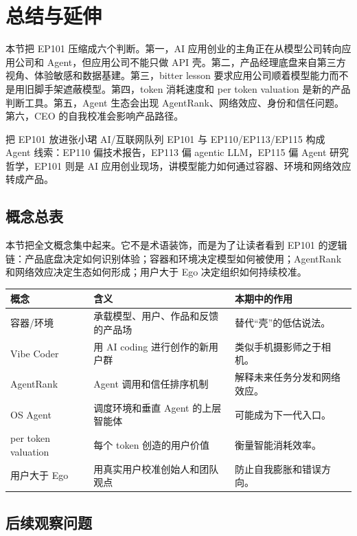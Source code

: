 \section{总结与延伸}

本节把 EP101 压缩成六个判断。第一，AI 应用创业的主角正在从模型公司转向应用公司和 Agent，但应用公司不能只做 API 壳。第二，产品经理底盘来自第三方视角、体验敏感和数据基建。第三，bitter lesson 要求应用公司顺着模型能力而不是用旧脚手架遮蔽模型。第四，token 消耗速度和 per token valuation 是新的产品判断工具。第五，Agent 生态会出现 AgentRank、网络效应、身份和信任问题。第六，CEO 的自我校准会影响产品路径。

\begin{importantbox}{把 EP101 放进张小珺 AI/互联网队列}
EP101 与 EP110/EP113/EP115 构成 Agent 线索：EP110 偏技术报告，EP113 偏 agentic LLM，EP115 偏 Agent 研究哲学，EP101 则是 AI 应用创业现场，讲模型能力如何通过容器、环境和网络效应转成产品。
\end{importantbox}

\subsection{概念总表}

本节把全文概念集中起来。它不是术语装饰，而是为了让读者看到 EP101 的逻辑链：产品底盘决定如何识别体验；容器和环境决定模型如何被使用；AgentRank 和网络效应决定生态如何形成；用户大于 Ego 决定组织如何持续校准。

\noindent\begin{tabularx}{\textwidth}{p{}p{}X}
\toprule
概念 & 含义 & 本期中的作用 \\
\midrule
容器/环境 & 承载模型、用户、作品和反馈的产品场 & 替代“壳”的低估说法。 \\
Vibe Coder & 用 AI coding 进行创作的新用户群 & 类似手机摄影师之于相机。 \\
AgentRank & Agent 调用和信任排序机制 & 解释未来任务分发和网络效应。 \\
OS Agent & 调度环境和垂直 Agent 的上层智能体 & 可能成为下一代入口。 \\
per token valuation & 每个 token 创造的用户价值 & 衡量智能消耗效率。 \\
用户大于 Ego & 用真实用户校准创始人和团队观点 & 防止自我膨胀和错误方向。 \\
\bottomrule
\end{tabularx}

\subsection{后续观察问题}

